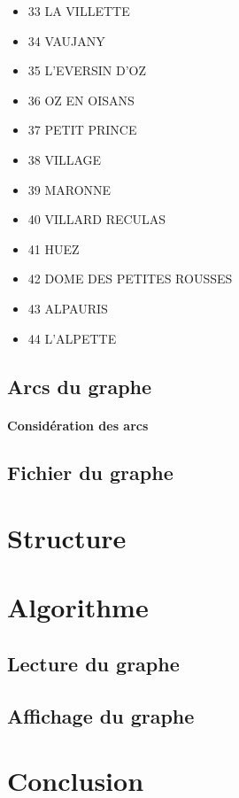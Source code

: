 \documentclass[a4]{article}
\begin{document}
\begin{itemize}
			\item 33 LA VILLETTE
			\item 34 VAUJANY
			\item 35 L'EVERSIN D'OZ
			\item 36 OZ EN OISANS
			\item 37 PETIT PRINCE
			\item 38 VILLAGE
			\item 39 MARONNE
			\item 40 VILLARD RECULAS
			\item 41 HUEZ
			\item 42 DOME DES PETITES ROUSSES
			\item 43 ALPAURIS
			\item 44 L'ALPETTE
			\end{itemize}
		\subsection{Arcs du graphe}
			\paragraph{Considération des arcs\\}
		\subsection{Fichier du graphe}
	\section{Structure}
	\section{Algorithme}
		\subsection{Lecture du graphe}
		\subsection{Affichage du graphe}
	\section{Conclusion}
\end{document}
